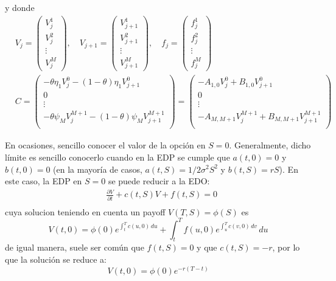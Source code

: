 y donde
\begin{align*}
    &\boxed{
        V_j = \begin{pmatrix}
            V_j^1 \\
            V_j^2 \\
            \vdots \\
            V_j^M
        \end{pmatrix}, \quad
        V_{j+1} = \begin{pmatrix}
            V_{j+1}^1 \\
            V_{j+1}^2 \\
            \vdots \\
            V_{j+1}^M
        \end{pmatrix}, \quad
        f_j = \begin{pmatrix}
            f_j^1 \\
            f_j^2 \\
            \vdots \\
            f_j^M
        \end{pmatrix}
    } \\
    &\boxed{
        C = \begin{pmatrix}
            -\theta\eta_1 V_j^{0} - (1-\theta)\eta_1 V_{j+1}^{0} \\
            0 \\
            \vdots \\
            -\theta\psi_M V_j^{M+1} - (1-\theta)\psi_M V_{j+1}^{M+1} \\
        \end{pmatrix}
        = \begin{pmatrix}
            -A_{1,0}V_j^{0} + B_{1,0}V_{j+1}^{0} \\
            0 \\
            \vdots \\
            -A_{M, M+1} V_j^{M+1} + B_{M, M+1} V_{j+1}^{M+1} \\
        \end{pmatrix}
    }
\end{align*}

En ocasiones, sencillo conocer el valor de la opción en $S=0$. Generalmente, dicho límite es sencillo conocerlo cuando en la EDP se cumple que $a(t,0)=0$ y $b(t,0)=0$ (en la mayoría de casos, $a(t,S)=1/2\sigma^2S^2$ y $b(t,S)=rS$). En este caso, la EDP en $S=0$ se puede reducir a la EDO:\@
\begin{align*}
    &\frac{\partial V}{\partial t} + c(t, S) V + f(t, S) = 0 \\
\end{align*}
cuya solucion teniendo en cuenta un payoff $V(T,S)=\phi(S)$ es
\begin{equation*}
    \boxed{V(t, 0) = \phi(0) e^{\int_t^T c(u, 0)\,du} + \int_t^T f(u, 0) e^{\int_u^T c(v, 0)\,dv}\,du}
\end{equation*}
de igual manera, suele ser común que $f(t,S)=0$ y que $c(t,S)=-r$, por lo que la solución se reduce a:
\begin{equation*}
    V(t, 0) = \phi(0) e^{-r(T-t)}
\end{equation*}

